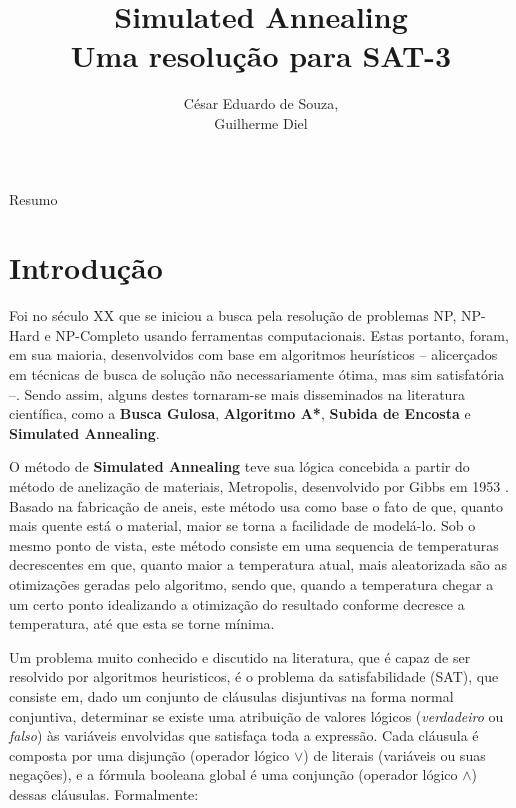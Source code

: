 \documentclass[12pt]{article}
\title{Simulated Annealing\\ Uma resolução para SAT-3}
\author{César Eduardo de Souza\inst{1},\\ Guilherme Diel\inst{1}}
\begin{document}
 

\maketitle

     
\begin{resumo} 
  Resumo
\end{resumo}


\section{Introdução}
\label{sec:introducao}

Foi no século XX que se iniciou a busca pela resolução de problemas NP, NP-Hard e NP-Completo usando ferramentas computacionais. 
%
Estas portanto, foram, em sua maioria, desenvolvidos com base em algoritmos heurísticos – alicerçados em técnicas de busca de solução não necessariamente ótima, mas sim satisfatória –. 
%
Sendo assim, alguns destes tornaram-se mais disseminados na literatura científica, como a \textbf{Busca Gulosa}, \textbf{Algoritmo A*}, \textbf{Subida de Encosta} e \textbf{Simulated Annealing}. 

O método de \textbf{Simulated Annealing} teve sua lógica concebida a partir do método de anelização de materiais, Metropolis, desenvolvido por Gibbs em 1953 \cite{metropolis1953equation}.
%
Basado na fabricação de aneis, este método usa como base o fato de que, quanto mais quente está o material, maior se torna a facilidade de modelá-lo.
%
Sob o mesmo ponto de vista, este método consiste em uma sequencia de temperaturas decrescentes em que, quanto maior a temperatura atual, mais aleatorizada são as otimizações geradas pelo algoritmo, sendo que, quando a temperatura chegar a um certo ponto idealizando a otimização do resultado conforme decresce a temperatura, até que esta se torne mínima.

Um problema muito conhecido e discutido na literatura, que é capaz de ser resolvido por algoritmos heuristicos, é o problema da satisfabilidade (SAT), que consiste em, dado um conjunto de cláusulas disjuntivas na forma normal conjuntiva, determinar se existe uma atribuição de valores lógicos (\textit{verdadeiro} ou \textit{falso}) às variáveis envolvidas que satisfaça toda a expressão.
%
Cada cláusula é composta por uma disjunção (operador lógico $\lor$) de literais (variáveis ou suas negações), e a fórmula booleana global é uma conjunção (operador lógico $\land$) dessas cláusulas. Formalmente:
\end{document}
